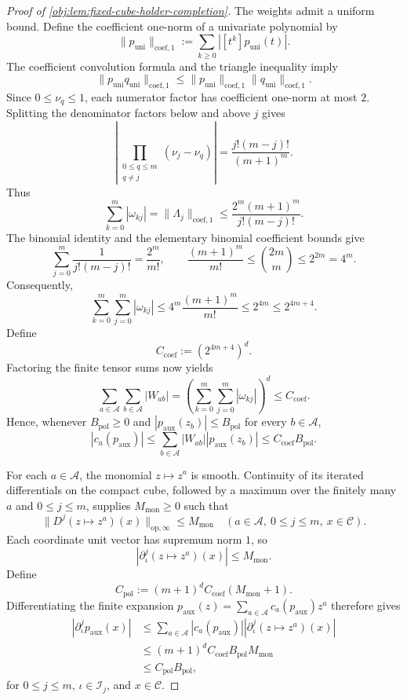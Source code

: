 \begin{proof}[Proof of \cref{obj:lem:fixed-cube-holder-completion}]
The weights admit a uniform bound. Define the coefficient one-norm of a univariate polynomial by
\[
\|p_{\mathrm{uni}}\|_{\mathrm{coef},1}
:=
\sum_{k\ge0}|[t^k]p_{\mathrm{uni}}(t)|.
\]
The coefficient convolution formula and the triangle inequality imply
\[
\|p_{\mathrm{uni}}q_{\mathrm{uni}}\|_{\mathrm{coef},1}
\le
\|p_{\mathrm{uni}}\|_{\mathrm{coef},1}
\|q_{\mathrm{uni}}\|_{\mathrm{coef},1}.
\]
Since \(0\le\nu_q\le1\), each numerator factor has coefficient one-norm at most \(2\). Splitting the denominator factors below and above \(j\) gives
\[
\left|
\prod_{\substack{0\le q\le m\\q\ne j}}(\nu_j-\nu_q)
\right|
=
\frac{j!(m-j)!}{(m+1)^m}.
\]
Thus
\[
\sum_{k=0}^m|\omega_{kj}|
=
\|\Lambda_j\|_{\mathrm{coef},1}
\le
\frac{2^m(m+1)^m}{j!(m-j)!}.
\]
The binomial identity and the elementary binomial coefficient bounds give
\[
\sum_{j=0}^m\frac{1}{j!(m-j)!}
=\frac{2^m}{m!},
\qquad
\frac{(m+1)^m}{m!}
\le\binom{2m}{m}\le 2^{2m}=4^m.
\]
Consequently,
\[
\sum_{k=0}^m\sum_{j=0}^m|\omega_{kj}|
\le
4^m\frac{(m+1)^m}{m!}
\le 2^{4m}
\le 2^{4m+4}.
\]
Define
\[
C_{\mathrm{coef}}:=(2^{4m+4})^d.
\]
Factoring the finite tensor sums now yields
\[
\sum_{a\in\mathscr A}\sum_{b\in\mathscr A}|W_{ab}|
=
\left(\sum_{k=0}^m\sum_{j=0}^m|\omega_{kj}|\right)^d
\le C_{\mathrm{coef}}.
\]
Hence, whenever \(B_{\mathrm{pol}}\ge0\) and
\(|p_{\mathrm{aux}}(z_b)|\le B_{\mathrm{pol}}\) for every \(b\in\mathscr A\),
\[
|c_a(p_{\mathrm{aux}})|
\le
\sum_{b\in\mathscr A}|W_{ab}|
|p_{\mathrm{aux}}(z_b)|
\le C_{\mathrm{coef}}B_{\mathrm{pol}}.
\]

For each \(a\in\mathscr A\), the monomial \(z\mapsto z^a\) is smooth. Continuity of its iterated differentials on the compact cube, followed by a maximum over the finitely many \(a\) and \(0\le j\le m\), supplies \(M_{\mathrm{mon}}\ge0\) such that
\[
\|D^j(z\mapsto z^a)(x)\|_{\mathrm{op},\infty}
\le M_{\mathrm{mon}}
\quad(a\in\mathscr A,\ 0\le j\le m,\ x\in\mathscr C).
\]
Each coordinate unit vector has supremum norm \(1\), so
\[
|\partial_\iota^j(z\mapsto z^a)(x)|
\le M_{\mathrm{mon}}.
\]
Define
\[
C_{\mathrm{pol}}
:=
(m+1)^d C_{\mathrm{coef}}(M_{\mathrm{mon}}+1).
\]
Differentiating the finite expansion
\(p_{\mathrm{aux}}(z)=\sum_{a\in\mathscr A}c_a(p_{\mathrm{aux}})z^a\)
therefore gives
\[
\begin{aligned}
|\partial_\iota^j p_{\mathrm{aux}}(x)|
&\le
\sum_{a\in\mathscr A}|c_a(p_{\mathrm{aux}})|
|\partial_\iota^j(z\mapsto z^a)(x)|\\
&\le (m+1)^d C_{\mathrm{coef}}B_{\mathrm{pol}}M_{\mathrm{mon}}\\
&\le C_{\mathrm{pol}}B_{\mathrm{pol}},
\end{aligned}
\]
for \(0\le j\le m\), \(\iota\in\mathscr I_j\), and \(x\in\mathscr C\).


\end{proof}

